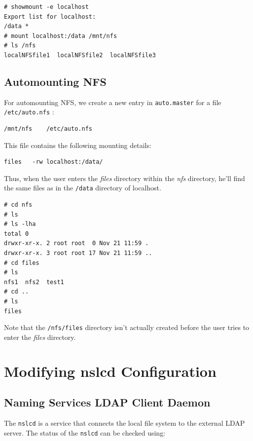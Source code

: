 \vspace{-15pt}
\begin{verbatim}
# showmount -e localhost
Export list for localhost:
/data *
# mount localhost:/data /mnt/nfs
# ls /nfs
localNFSfile1  localNFSfile2  localNFSfile3
\end{verbatim}

\subsection{Automounting NFS}
For automounting NFS, we create a new entry in \verb|auto.master| for a file \verb|/etc/auto.nfs| :

\vspace{-15pt}
\begin{verbatim}
/mnt/nfs	/etc/auto.nfs
\end{verbatim}
\vspace{-10pt}

\noindent
This file contains the following mounting details:	
\vspace{-15pt}
\begin{verbatim}
files	-rw	localhost:/data/
\end{verbatim}
\vspace{-10pt}

\noindent Thus, when the user enters the \textit{files} directory within the \textit{nfs} directory, he'll find the same files as in the \verb|/data| directory of localhost. 

\vspace{-15pt}
\begin{verbatim}
# cd nfs
# ls
# ls -lha
total 0
drwxr-xr-x. 2 root root  0 Nov 21 11:59 .
drwxr-xr-x. 3 root root 17 Nov 21 11:59 ..
# cd files
# ls
nfs1  nfs2  test1
# cd ..
# ls
files
\end{verbatim}

\noindent	Note that the \verb|/nfs/files| directory isn't actually created before the user tries to enter the \textit{files} directory. 

\section{Modifying nslcd Configuration}
\subsection{Naming Services LDAP Client Daemon}
The \verb|nslcd| is a service that connects the local file system to the external LDAP server. The status of the \verb|nslcd| can be checked using:

